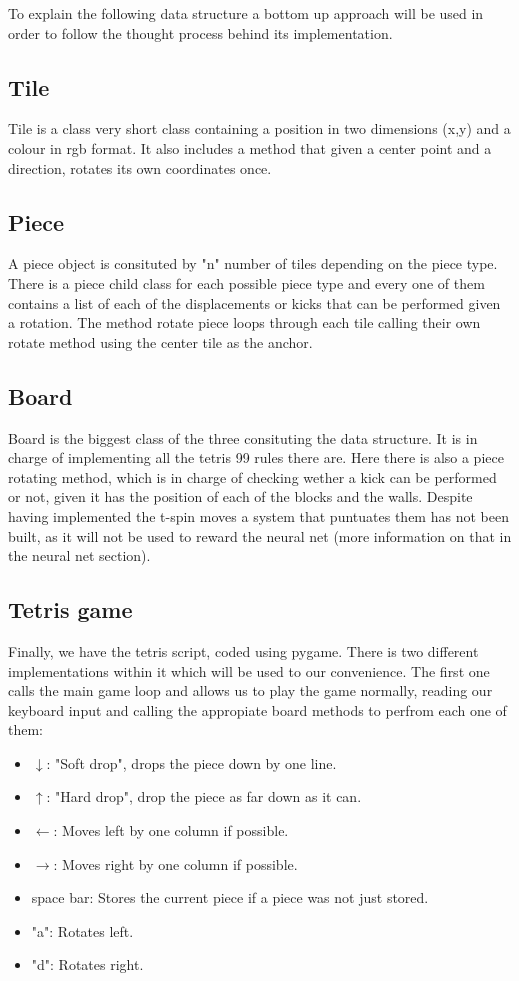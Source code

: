 To explain the following data structure a bottom up approach will be used in order to follow the thought process behind its implementation.

\subsection{Tile}
Tile is a class very short class containing a position in two dimensions (x,y) and a colour in rgb format. It also includes a method that given a center point and a direction, rotates its own coordinates once.

\subsection{Piece}
A piece object is consituted by "n" number of tiles depending on the piece type. There is a piece child class for each possible piece type and every one of them contains a list of each of the displacements or kicks that can be performed given a rotation. The method rotate piece loops through each tile calling their own rotate method using the center tile as the anchor.

\subsection{Board}
Board is the biggest class of the three consituting the data structure. It is in charge of implementing all the tetris 99 rules there are. Here there is also a piece rotating method, which is in charge of checking wether a kick can be performed or not, given it has the position of each of the blocks and the walls. Despite having implemented the t-spin moves a system that puntuates them has not been built, as it will not be used to reward the neural net (more information on that in the neural net section). 

\subsection{Tetris game}
Finally, we have the tetris script, coded using pygame. There is two different implementations within it which will be used to our convenience. The first one calls the main game loop and allows us to play the game normally, reading our keyboard input and calling the appropiate board methods to perfrom each one of them:

\begin{itemize}
   \item	$\downarrow$: "Soft drop", drops the piece down by one line.
   \item	$\uparrow$: "Hard drop", drop the piece as far down as it can.
   \item	$\leftarrow$: Moves left by one column if possible.
   \item	$\rightarrow$: Moves right by one column if possible. 
   \item	space bar: Stores the current piece if a piece was not just stored.
   \item	"a": Rotates left.
   \item	"d": Rotates right.
\end{itemize}

